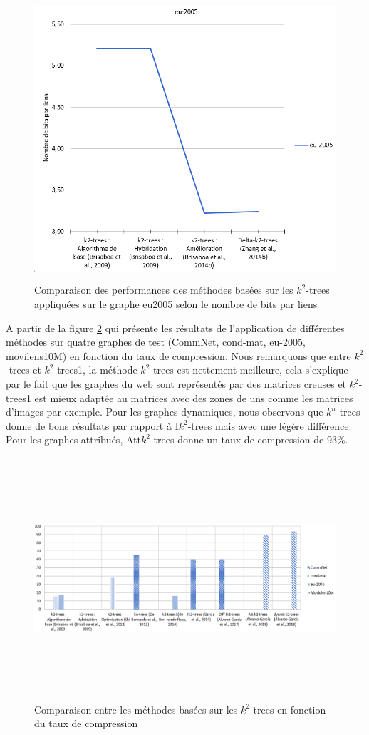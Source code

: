  \begin{figure}[H]
		\includegraphics[height=10.5cm, width=16cm]{./ressources/image/eu2005-k2.png}
		\caption{Comparaison des performances des méthodes basées sur les $k^2$-trees appliquées sur le graphe eu2005 selon le nombre de bits par liens}
		\label{eu2005-k2}
	\end{figure}
	
A partir de la figure \ref{k2-taux}  qui présente les résultats de l'application de différentes méthodes sur quatre graphes de test (CommNet, cond-mat, eu-2005, movilens10M) en fonction du taux de compression. Nous remarquons que entre $k^2$-trees et $k^2$-trees1, la méthode $k^2$-trees est nettement meilleure, cela s'explique par le fait que les graphes du web sont représentés par des matrices creuses et $k^2$-trees1 est mieux adaptée au matrices avec des zones de uns comme les matrices d'images par exemple.	Pour les graphes dynamiques, nous observons que $k^n$-trees donne de bons résultats par rapport à I$k^2$-trees mais avec une légère différence. Pour les graphes attribués, Att$k^2$-trees donne un taux de compression de 93\%. 
	\begin{figure}[H]
		\includegraphics[height=9cm, width=18cm]{./ressources/image/k2-taux.png}
		\caption{Comparaison entre les méthodes basées sur les $k^2$-trees en fonction du taux de compression}
		\label{k2-taux}
	\end{figure}
	


